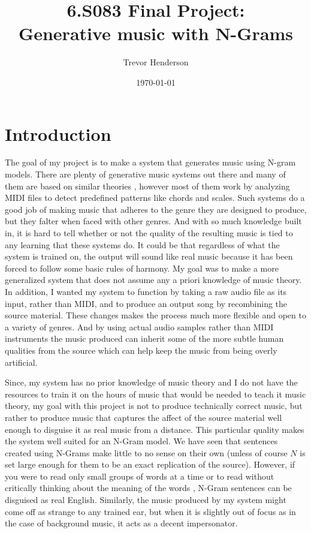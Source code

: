 \documentclass{amsart}
\theoremstyle{definition}
\begin{document}
\title{6.S083 Final Project: \\Generative music with N-Grams}
\author{Trevor Henderson}
\date{\today}
\maketitle

\section{Introduction}

The goal of my project is to make a system that generates music using N-gram models.
There are plenty of generative music systems out there and many of them are based on similar theories \cite{prevProject},
however most of them work by analyzing MIDI files to detect predefined patterns like chords and scales.
Such systems do a good job of making music that adheres to the genre they are designed to produce, 
but they falter when faced with other genres.
And with so much knowledge built in, it is hard to tell whether or not the quality 
of the resulting music 
is tied to any learning that these systems do.
It could be that regardless of what the system is trained on, the output will sound like real music because it has been forced to follow some basic rules of harmony.
My goal was to make a more generalized system that does not assume any a priori knowledge of music theory.
In addition, I wanted my system to function by taking a raw audio file as its input, rather than MIDI, and to produce an output song by recombining the source material.
These changes makes the process much more flexible and open to a variety of genres. 
And by using actual audio samples rather than MIDI instruments the music produced can inherit some of the more subtle human qualities from the source which can help keep the music from being overly artificial.

Since, my system has no prior knowledge of music theory and I do not have the resources to train it on the hours of music that would be needed to teach it music theory, my goal with this project is not to produce technically correct music, but rather to produce music that captures the affect of the source material well enough to disguise it as real music from a distance.
This particular quality makes the system well suited for an N-Gram model.
We have seen that sentences created using N-Grams make little to no sense on their own (unless of course $N$ is set large enough for them to be an exact replication of the source).
However, if you were to read only small groups of words at a time 
or to read without 
critically thinking about the meaning of the words 
, N-Gram sentences can be disguised as real English. 
Similarly, the music produced by my system might come off as strange to any trained ear,
but when it is slightly out of focus as in the case of background music, it acts as a decent impersonator.
\end{document}

